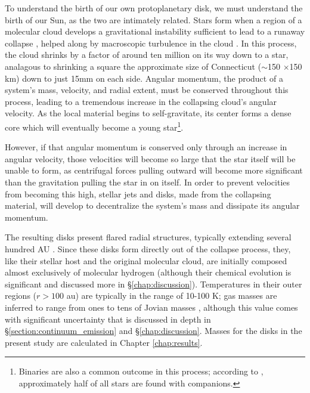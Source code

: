 To understand the birth of our own protoplanetary disk, we must understand the birth of our Sun, as the two are intimately related. Stars form when a region of a molecular cloud develops a gravitational instability sufficient to lead to a runaway collapse \citep{Shu1987}, helped along by macroscopic turbulence in the cloud \citep{MckeeOstriker2007}. In this process, the cloud shrinks by a factor of around ten million on its way down to a star, analagous to shrinking a square the approximate size of Connecticut ($\sim$150 $\times$150 km) down to just 15mm on each side. Angular momentum, the product of a system's mass, velocity, and radial extent, must be conserved throughout this process,  leading to a tremendous increase in the collapsing cloud's angular velocity. As the local material begins to self-gravitate, its center forms a dense core which will eventually become a young star\footnote{Binaries are also a common outcome in this process; according to \citet{DucheneKraus2013}, approximately half of all stars are found with companions.}.

However, if that angular momentum is conserved only through an increase in angular velocity, those velocities will become so large that the star itself will be unable to form, as centrifugal forces pulling outward will become more significant than the gravitation pulling the star in on itself. In order to prevent velocities from becoming this high, stellar jets and disks, made from the collapsing material, will develop to decentralize the system's mass and dissipate its angular momentum.

The resulting disks present flared radial structures, typically extending several hundred AU \citep{VicenteAlves2005}. Since these disks form directly out of the collapse process, they, like their stellar host and the original molecular cloud, are initially composed almost exclusively of molecular hydrogen (although their chemical evolution is significant and discussed more in \S\ref{chap:discussion}). Temperatures in their outer regions ($r > 100$ au) are typically in the range of 10-100 K; gas masses are inferred to range from ones to tens of Jovian masses \citep{AndrewsWilliams2005}, although this value comes with significant uncertainty that is discussed in depth in \S\ref{section:continuum_emission} and \S\ref{chap:discussion}. Masses for the disks in the present study are calculated in Chapter \ref{chap:results}.





